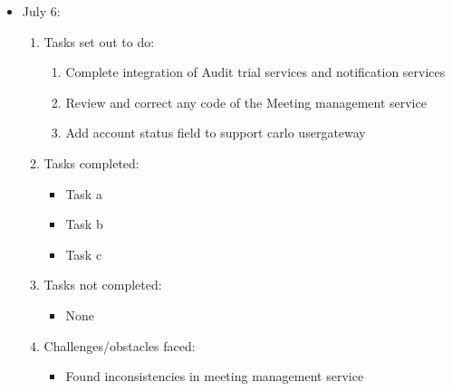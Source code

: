 \documentclass[12pt]{article}
\begin{document}
	\begin{itemize}
		\item July 6:
		\begin{enumerate}
			\item Tasks set out to do:
			\begin{enumerate}
				\item Complete integration of  Audit trial services and notification services
				\item Review and correct any code of the Meeting management service
				\item Add account status field to support carlo usergateway
			\end{enumerate}
			\item Tasks completed:
			\begin{itemize}
				\item Task a
				\item Task b
				\item Task c
			\end{itemize}
			\item Tasks not completed:
			\begin{itemize}
				\item None
			\end{itemize}
			\item Challenges/obstacles faced:
			\begin{itemize}
				\item Found inconsistencies in meeting management service
			\end{itemize}			
		\end{enumerate}
	\end{itemize}
	
\end{document}
